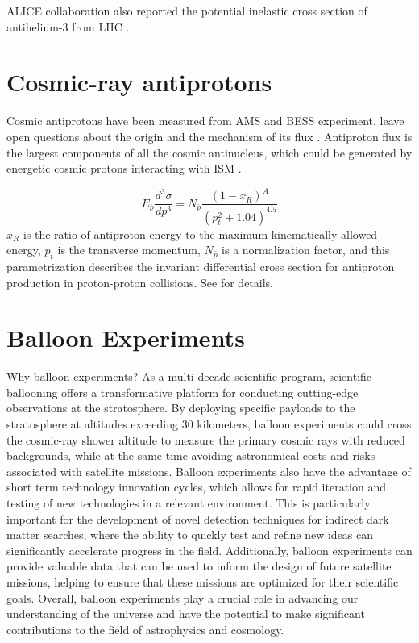 ALICE collaboration also reported the potential inelastic cross section of antihelium-3 from \ac{LHC} \cite{Serksnyte}.

\section{Cosmic-ray antiprotons}
\label{chap:intro:antirpotons}
Cosmic antiprotons have been measured from AMS and BESS experiment, leave open questions about the origin and the mechanism of its flux \cite{PhysRevLett.117.091103, YAMAMOTO2013227, sakai2021new}. Antiproton flux is the largest components of all the cosmic antinucleus, which could be generated by energetic cosmic protons interacting with \ac{ISM} \cite{Moskalenko_2002, kiraly1981antiprotons}.

\begin{equation}
    E_{\bar{p}}\frac{d^3\sigma}{dp^3}=N_{\bar{p}} \frac{(1-x_R)^A}{(p_t^2+1.04)^{4.5}}
\end{equation}
$x_R$ is the ratio of antiproton energy to the maximum kinematically allowed energy, $p_t$ is the transverse momentum, $N_{\bar{p}}$ is a normalization factor, and this parametrization describes the invariant differential cross section for antiproton production in proton-proton collisions. See \cite{PhysRevD.90.085017} for details.

\section{Balloon Experiments}
\label{chap:intro:balloon}
Why balloon experiments? As a multi-decade scientific program, scientific ballooning offers a transformative platform for conducting cutting-edge observations at the stratosphere. By deploying specific payloads to the stratosphere at altitudes exceeding 30 kilometers, balloon experiments could cross the cosmic-ray shower altitude to measure the primary cosmic rays with reduced backgrounds, while at the same time avoiding astronomical costs and risks associated with satellite missions. Balloon experiments also have the advantage of short term technology innovation cycles, which allows for rapid iteration and testing of new technologies in a relevant environment. This is particularly important for the development of novel detection techniques for indirect dark matter searches, where the ability to quickly test and refine new ideas can significantly accelerate progress in the field. Additionally, balloon experiments can provide valuable data that can be used to inform the design of future satellite missions, helping to ensure that these missions are optimized for their scientific goals. Overall, balloon experiments play a crucial role in advancing our understanding of the universe and have the potential to make significant contributions to the field of astrophysics and cosmology.

